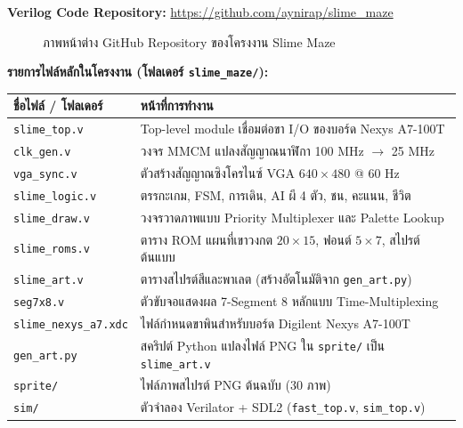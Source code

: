 \clearpage
{}

\noindent\textbf{Verilog Code Repository:} \url{https://github.com/aynirap/slime_maze}

\begin{figure}[H]
    \centering
    \caption{ภาพหน้าต่าง GitHub Repository ของโครงงาน Slime Maze}
\end{figure}

\noindent\textbf{รายการไฟล์หลักในโครงงาน (โฟลเดอร์ \texttt{slime\_maze/}):}

\begin{table}[H]
    \centering
    \begin{tabularx}{\textwidth}{@{}l L@{}}
        \toprule
        \textbf{ชื่อไฟล์ / โฟลเดอร์} & \textbf{หน้าที่การทำงาน} \\
        \midrule
        \texttt{slime\_top.v} & Top-level module เชื่อมต่อขา I/O ของบอร์ด Nexys A7-100T \\
        \texttt{clk\_gen.v} & วงจร MMCM แปลงสัญญาณนาฬิกา 100 MHz $\rightarrow$ 25 MHz \\
        \texttt{vga\_sync.v} & ตัวสร้างสัญญาณซิงโครไนซ์ VGA $640\times480$ @ 60 Hz \\
        \texttt{slime\_logic.v} & ตรรกะเกม, FSM, การเดิน, AI ผี 4 ตัว, ชน, คะแนน, ชีวิต \\
        \texttt{slime\_draw.v} & วงจรวาดภาพแบบ Priority Multiplexer และ Palette Lookup \\
        \texttt{slime\_roms.v} & ตาราง ROM แผนที่เขาวงกต $20\times15$, ฟอนต์ $5\times7$, สไปรต์ต้นแบบ \\
        \texttt{slime\_art.v} & ตารางสไปรต์สีและพาเลต (สร้างอัตโนมัติจาก \texttt{gen\_art.py}) \\
        \texttt{seg7x8.v} & ตัวขับจอแสดงผล 7-Segment 8 หลักแบบ Time-Multiplexing \\
        \texttt{slime\_nexys\_a7.xdc} & ไฟล์กำหนดขาพินสำหรับบอร์ด Digilent Nexys A7-100T \\
        \texttt{gen\_art.py} & สคริปต์ Python แปลงไฟล์ PNG ใน \texttt{sprite/} เป็น \texttt{slime\_art.v} \\
        \texttt{sprite/} & ไฟล์ภาพสไปรต์ PNG ต้นฉบับ (30 ภาพ) \\
        \texttt{sim/} & ตัวจำลอง Verilator + SDL2 (\texttt{fast\_top.v}, \texttt{sim\_top.v}) \\
        \bottomrule
    \end{tabularx}
\end{table}

